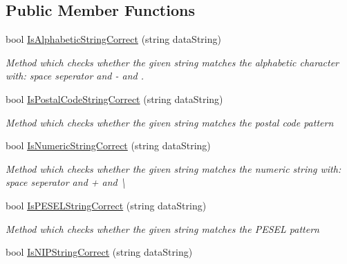 \subsection*{Public Member Functions}
\begin{DoxyCompactItemize}
\item 
bool \hyperlink{class_baudi_1_1_client_1_1_view_models_1_1_validation_1_1_data_fields_1_1_data_type_validator_aa259a75ebc5c5a9802b2afb743dcba24}{Is\+Alphabetic\+String\+Correct} (string data\+String)
\begin{DoxyCompactList}\small\item\em Method which checks whether the given string matches the alphabetic character with\+: space seperator and -\/ and . \end{DoxyCompactList}\item 
bool \hyperlink{class_baudi_1_1_client_1_1_view_models_1_1_validation_1_1_data_fields_1_1_data_type_validator_a704d79931e60e6919f6baf8a12d2d57f}{Is\+Postal\+Code\+String\+Correct} (string data\+String)
\begin{DoxyCompactList}\small\item\em Method which checks whether the given string matches the postal code pattern \end{DoxyCompactList}\item 
bool \hyperlink{class_baudi_1_1_client_1_1_view_models_1_1_validation_1_1_data_fields_1_1_data_type_validator_a9e0a929b738c50485eac62f2640214c9}{Is\+Numeric\+String\+Correct} (string data\+String)
\begin{DoxyCompactList}\small\item\em Method which checks whether the given string matches the numeric string with\+: space seperator and + and \textbackslash{} \end{DoxyCompactList}\item 
bool \hyperlink{class_baudi_1_1_client_1_1_view_models_1_1_validation_1_1_data_fields_1_1_data_type_validator_af3fbb726a3bc424c8e07b9b864ee144a}{Is\+P\+E\+S\+E\+L\+String\+Correct} (string data\+String)
\begin{DoxyCompactList}\small\item\em Method which checks whether the given string matches the P\+E\+S\+E\+L pattern \end{DoxyCompactList}\item 
bool \hyperlink{class_baudi_1_1_client_1_1_view_models_1_1_validation_1_1_data_fields_1_1_data_type_validator_a958c11272cc39940eca14f9d8b402732}{Is\+N\+I\+P\+String\+Correct} (string data\+String)

\end{DoxyCompactItemize}
